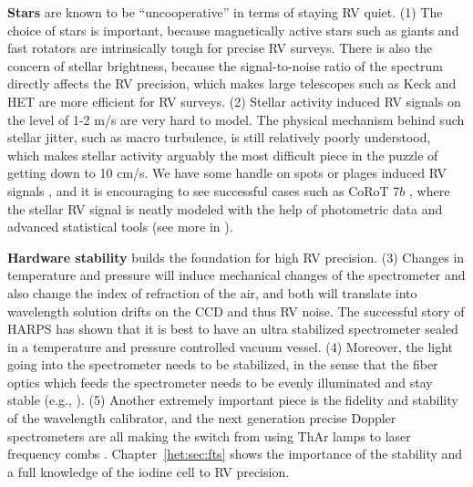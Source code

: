 {\bf Stars} are known to be ``uncooperative'' in terms of staying RV
quiet. (1) The choice of stars is important, because magnetically
active stars such as giants and fast rotators are intrinsically tough
for precise RV surveys. There is also the concern of stellar
brightness, because the signal-to-noise ratio of the spectrum directly
affects the RV precision, which makes large telescopes such as Keck
and HET are more efficient for RV surveys. (2) Stellar activity
induced RV signals on the level of 1-2 m/s are very hard to model. The
physical mechanism behind such stellar jitter, such as macro
turbulence, is still relatively poorly understood, which makes stellar
activity arguably the most difficult piece in the puzzle of getting
down to 10 cm/s. We have some handle on spots or plages induced RV
signals \citep{2014ApJ...796..132D}, and it is encouraging to see
successful cases such as CoRoT 7$b$ \citep{2014MNRAS.443.2517H}, where
the stellar RV signal is neatly modeled with the help of photometric
data and advanced statistical tools (see more in
\citealt{2016MNRAS.tmp..650V}).

{\bf Hardware stability} builds the foundation for high RV
precision. (3) Changes in temperature and pressure will induce
mechanical changes of the spectrometer and also change the index of
refraction of the air, and both will translate into wavelength
solution drifts on the CCD and thus RV noise. The successful story of
HARPS has shown that it is best to have an ultra stabilized
spectrometer sealed in a temperature and pressure controlled vacuum
vessel. (4) Moreover, the light going into the spectrometer needs to
be stabilized, in the sense that the fiber optics which feeds the
spectrometer needs to be evenly illuminated and stay stable (e.g.,
\citealt{2015ApJ...806...61H}). (5) Another extremely important piece
is the fidelity and stability of the wavelength calibrator, and the
next generation precise Doppler spectrometers are all making the
switch from using ThAr lamps to laser frequency combs
\citep{2008Natur.452..610L,2016NatCo...710436Y}. Chapter~\ref{het:sec:fts}
shows the importance of the stability and a full knowledge of the
iodine cell to RV precision.

